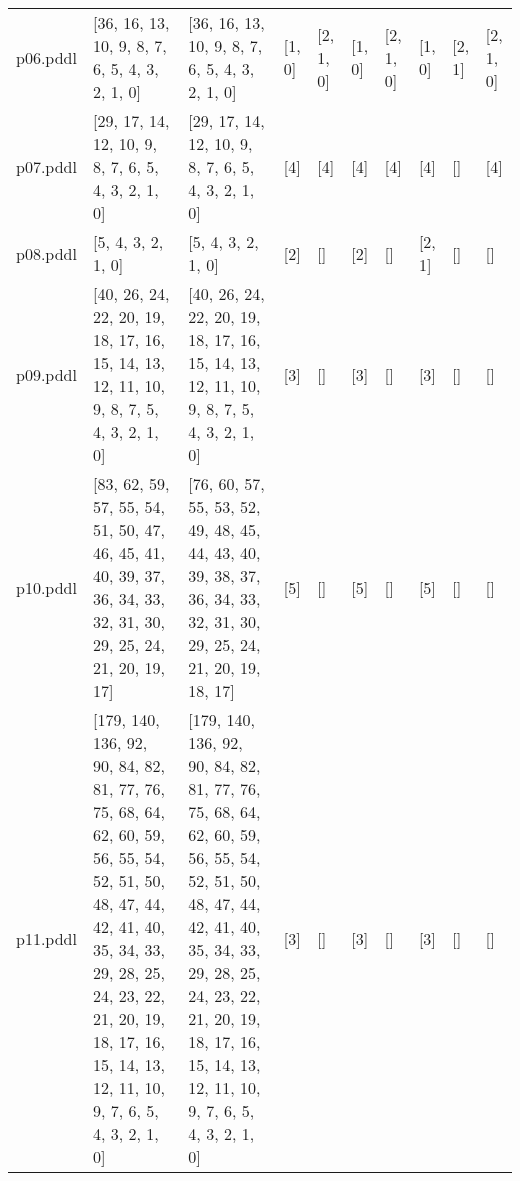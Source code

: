 \documentclass{article}
\begin{document}
\begin{tabular}{@{}lrrrrrrrrr@{}}
p06.pddl & \multicolumn{1}{|l|}{[36, 16, 13, 10, 9, 8, 7, 6, 5, 4, 3, 2, 1, 0]} & \multicolumn{1}{|l|}{[36, 16, 13, 10, 9, 8, 7, 6, 5, 4, 3, 2, 1, 0]} & \multicolumn{1}{|l|}{[1, 0]} & \multicolumn{1}{|l|}{[2, 1, 0]} & \multicolumn{1}{|l|}{[1, 0]} & \multicolumn{1}{|l|}{[2, 1, 0]} & \multicolumn{1}{|l|}{[1, 0]} & \multicolumn{1}{|l|}{[2, 1]} & \multicolumn{1}{|l|}{[2, 1, 0]} \\
p07.pddl & \multicolumn{1}{|l|}{[29, 17, 14, 12, 10, 9, 8, 7, 6, 5, 4, 3, 2, 1, 0]} & \multicolumn{1}{|l|}{[29, 17, 14, 12, 10, 9, 8, 7, 6, 5, 4, 3, 2, 1, 0]} & \multicolumn{1}{|l|}{[4]} & \multicolumn{1}{|l|}{[4]} & \multicolumn{1}{|l|}{[4]} & \multicolumn{1}{|l|}{[4]} & \multicolumn{1}{|l|}{[4]} & \multicolumn{1}{|l|}{[]} & \multicolumn{1}{|l|}{[4]} \\
p08.pddl & \multicolumn{1}{|l|}{[5, 4, 3, 2, 1, 0]} & \multicolumn{1}{|l|}{[5, 4, 3, 2, 1, 0]} & \multicolumn{1}{|l|}{[2]} & \multicolumn{1}{|l|}{[]} & \multicolumn{1}{|l|}{[2]} & \multicolumn{1}{|l|}{[]} & \multicolumn{1}{|l|}{[2, 1]} & \multicolumn{1}{|l|}{[]} & \multicolumn{1}{|l|}{[]} \\
p09.pddl & \multicolumn{1}{|l|}{[40, 26, 24, 22, 20, 19, 18, 17, 16, 15, 14, 13, 12, 11, 10, 9, 8, 7, 5, 4, 3, 2, 1, 0]} & \multicolumn{1}{|l|}{[40, 26, 24, 22, 20, 19, 18, 17, 16, 15, 14, 13, 12, 11, 10, 9, 8, 7, 5, 4, 3, 2, 1, 0]} & \multicolumn{1}{|l|}{[3]} & \multicolumn{1}{|l|}{[]} & \multicolumn{1}{|l|}{[3]} & \multicolumn{1}{|l|}{[]} & \multicolumn{1}{|l|}{[3]} & \multicolumn{1}{|l|}{[]} & \multicolumn{1}{|l|}{[]} \\
p10.pddl & \multicolumn{1}{|l|}{[83, 62, 59, 57, 55, 54, 51, 50, 47, 46, 45, 41, 40, 39, 37, 36, 34, 33, 32, 31, 30, 29, 25, 24, 21, 20, 19, 17]} & \multicolumn{1}{|l|}{[76, 60, 57, 55, 53, 52, 49, 48, 45, 44, 43, 40, 39, 38, 37, 36, 34, 33, 32, 31, 30, 29, 25, 24, 21, 20, 19, 18, 17]} & \multicolumn{1}{|l|}{[5]} & \multicolumn{1}{|l|}{[]} & \multicolumn{1}{|l|}{[5]} & \multicolumn{1}{|l|}{[]} & \multicolumn{1}{|l|}{[5]} & \multicolumn{1}{|l|}{[]} & \multicolumn{1}{|l|}{[]} \\
p11.pddl & \multicolumn{1}{|l|}{[179, 140, 136, 92, 90, 84, 82, 81, 77, 76, 75, 68, 64, 62, 60, 59, 56, 55, 54, 52, 51, 50, 48, 47, 44, 42, 41, 40, 35, 34, 33, 29, 28, 25, 24, 23, 22, 21, 20, 19, 18, 17, 16, 15, 14, 13, 12, 11, 10, 9, 7, 6, 5, 4, 3, 2, 1, 0]} & \multicolumn{1}{|l|}{[179, 140, 136, 92, 90, 84, 82, 81, 77, 76, 75, 68, 64, 62, 60, 59, 56, 55, 54, 52, 51, 50, 48, 47, 44, 42, 41, 40, 35, 34, 33, 29, 28, 25, 24, 23, 22, 21, 20, 19, 18, 17, 16, 15, 14, 13, 12, 11, 10, 9, 7, 6, 5, 4, 3, 2, 1, 0]} & \multicolumn{1}{|l|}{[3]} & \multicolumn{1}{|l|}{[]} & \multicolumn{1}{|l|}{[3]} & \multicolumn{1}{|l|}{[]} & \multicolumn{1}{|l|}{[3]} & \multicolumn{1}{|l|}{[]} & \multicolumn{1}{|l|}{[]} \\

\end{tabular}
\end{document}
